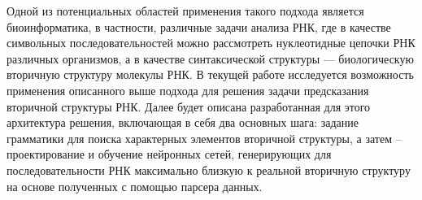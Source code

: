 Одной из потенциальных областей применения такого подхода является биоинформатика, в частности, различные задачи анализа РНК, где в качестве символьных последовательностей можно рассмотреть нуклеотидные цепочки РНК различных организмов, а в качестве синтаксической структуры --- биологическую вторичную структуру молекулы РНК. В текущей работе исследуется возможность применения описанного выше подхода для решения задачи предсказания вторичной структуры РНК. Далее будет описана разработанная для этого архитектура решения, включающая в себя два основных шага: задание грамматики для поиска характерных элементов вторичной структуры, а затем -- проектирование и обучение нейронных сетей, генерирующих для последовательности РНК максимально близкую к реальной вторичную структуру на основе полученных с помощью парсера данных.

